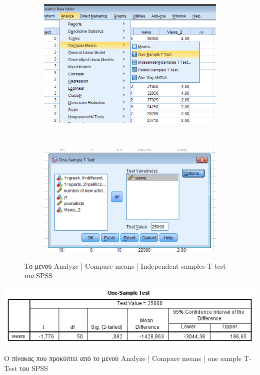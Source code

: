 \documentclass{assignment}
\begin{document}
\begin{Assignment}[Μέρος Β]
\begin{figure}[htbp]
  \centering
  \begin{subfigure}[b]{0.5\textwidth}
     \includegraphics[width=\textwidth,height=0.25\textheight]{images/menu_one_sample_T_test.png}
  \end{subfigure}%
   ~ %
  \begin{subfigure}[b]{0.5\textwidth}
    \includegraphics[width=\textwidth,height=0.25\textheight]{images/one_sample_T_test.png}
  \end{subfigure}
  \caption{Το μενού Analyze | Compare means | Independent samples T-test του SPSS}
\label{fig:one_sample_T_Test}
\end{figure}

\begin{table}[htbp]
\includegraphics[width=\textwidth]{images/table_one_sample_T_test.png}
\caption{Ο πίνακας που προκύπτει από το μενού Analyze | Compare means | one sample T-Test του SPSS}
\label{table:one_sample_T_Test}
\end{table}


\end{Assignment}
\end{document}
